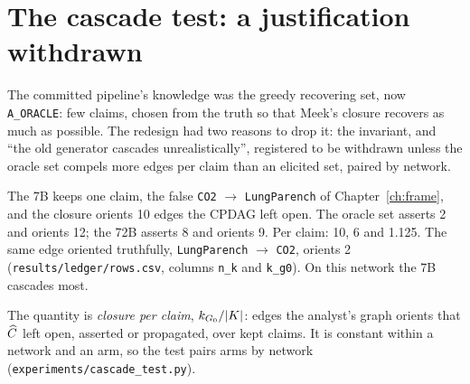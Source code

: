 
\begin{antes}
\end{antes}

\section{The cascade test: a justification withdrawn}\label{sec:sup-cascade}

The committed pipeline's knowledge was the greedy recovering set, now \texttt{A\_ORACLE}: few claims,
chosen from the truth so that Meek's closure recovers as much as possible. The redesign had two reasons
to drop it: the invariant, and ``the old generator cascades unrealistically'', registered to be
withdrawn unless the oracle set compels more edges per claim than an elicited set, paired by network.

\begin{exemplo}
The 7B keeps one claim, the false \texttt{CO2} $\to$ \texttt{LungParench} of Chapter~\ref{ch:frame},
and the closure orients 10 edges the CPDAG left open. The oracle set asserts 2 and orients 12; the 72B
asserts 8 and orients 9. Per claim: 10, 6 and 1.125. The same edge oriented truthfully,
\texttt{LungParench} $\to$ \texttt{CO2}, orients 2 (\texttt{results/ledger/rows.csv}, columns
\texttt{n\_k} and \texttt{k\_g0}). On this network the 7B cascades most.
\end{exemplo}

The quantity is \emph{closure per claim}, $k_{G_0}/|K|$: edges the analyst's graph orients that
$\widehat{C}$ left open, asserted or propagated, over kept claims. It is constant within a network and an arm,
so the test pairs arms by network (\texttt{experiments/cascade\_test.py}).

